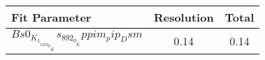 \begin{tabular}{l  c  | c }
\hline
\hline
Fit Parameter & Resolution &  Total  \\ 
\hline
$Bs0_K_1__1270_p__Ks_892_0__Kppim_pip_Dsm$ & 0.14 & 0.14 \\ 
\hline
\hline
\end{tabular}
